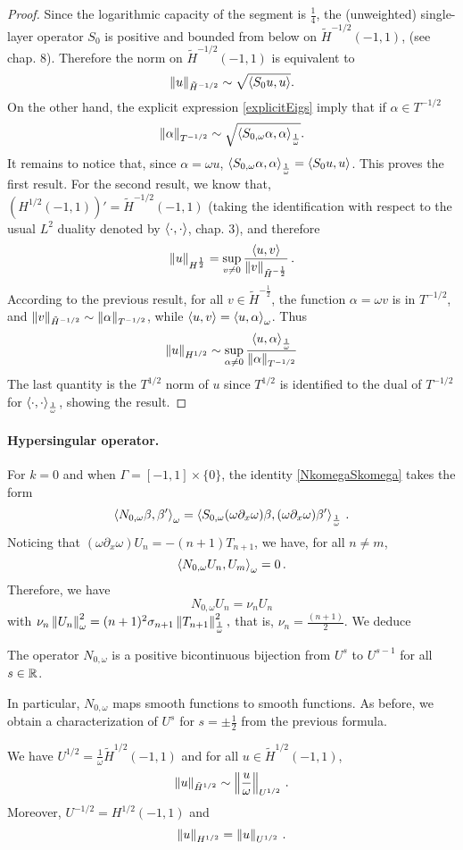 \documentclass[a4paper]{article}
\begin{document}
\begin{proof}
	Since the logarithmic capacity of the segment is $\frac{1}{4}$, the (unweighted) single-layer operator $S_0$ is positive and bounded from below on $\tilde{H}^{-1/2}(-1,1)$, (see \cite{mclean2000strongly} chap. 8). Therefore the norm on $\tilde{H}^{-1/2}(-1,1)$ is equivalent to 
	\[\left\|u\right\|_{\tilde{H}^{-1/2}} \sim \sqrt{\left\langle S_0u,u\right\rangle}.\]
	On the other hand, the explicit expression \eqref{explicitEigs} imply that if $\alpha\in T^{-1/2}$
	\[ \left\|\alpha\right\|_{T^{-1/2}} \sim \sqrt{\left\langle S_{0,\omega} \alpha,\alpha\right\rangle_\frac{1}{\omega}}.\]
	It remains to notice that, since $\alpha=\omega u$, $\left\langle S_{0,\omega} \alpha,\alpha\right\rangle_\frac{1}{\omega} = \left\langle S_0u,u\right\rangle$. This proves the first result. For the second result, we know that, $(H^{1/2}(-1,1))' =  \tilde{H}^{-1/2}(-1,1)$ (taking the identification with respect to the usual $L^2$ duality denoted by $\left\langle \cdot,\cdot\right\rangle$, \cite{mclean1986spectral} chap. 3), and therefore
	\[\left\|u\right\|_{H^{\frac{1}{2}}} = \sup_{ v\neq 0} \dfrac{\left\langle u,v\right\rangle}{\left\|v\right\|_{\tilde{H}^{-\frac{1}{2}}}}\,.\]
	According to the previous result, for all $v\in \tilde{H}^{-\frac{1}{2}}$, the function $\alpha = \omega v$ is in $T^{-1/2}$, and $\left\| v\right\|_{\tilde{H}^{-1/2}} \sim \left\|\alpha\right\|_{T^{-1/2}}$, while $\left\langle u,v\right\rangle = \left\langle u,\alpha\right\rangle_\omega$. Thus 
	\[\left\|u\right\|_{H^{1/2}} \sim \sup_{\alpha \neq 0} \dfrac{\left\langle u,\alpha\right\rangle_\frac{1}{\omega}}{\left\|\alpha\right\|_{T^{-1/2}}}\]
	The last quantity is the $T^{1/2}$ norm of $u$ since $T^{1/2}$ is identified to the dual of $T^{-1/2}$ for $\left\langle \cdot,\cdot\right\rangle_\frac{1}{\omega}$, showing the result. 
\end{proof}


\paragraph{Hypersingular operator.}For $k = 0$ and when $\Gamma = [-1,1]\times \{0\}$, the identity \eqref{NkomegaSkomega} takes the form
\[\left\langle N_{0,\omega} \beta,\beta'\right\rangle_\omega = \left\langle S_{0,\omega}  (\omega \partial_x \omega) \beta, (\omega \partial_x \omega) \beta'\right\rangle_\frac{1}{\omega}\,.\] 
Noticing that $(\omega \partial_x \omega) U_n = -(n+1) T_{n+1}$, we have, for all $n \neq m$,
\[\left\langle N_{0,\omega }U_n,U_m\right\rangle_\omega = 0 \,.\]
Therefore, we have 
\[N_{0,\omega} U_n = \nu_n U_n\] 
with 
$\nu_n\left\|U_n\right\|_{\omega}^2 = (n+1)^2 \sigma_{n+1} \left\|T_{n+1}\right\|_\frac{1}{\omega}^2,$
that is, $\nu_n = \frac{(n+1)}{2}$.
We deduce 
\begin{Lem}
	The operator $N_{0,\omega}$ is a positive bicontinuous bijection from $U^s$ to $U^{s-1}$ for all $s \in \mathbb{R}$.
	\label{NomegaMapProp}
\end{Lem} 
\noindent In particular, $N_{0,\omega}$ maps smooth functions to smooth functions. 
As before, we obtain a characterization of $U^{s}$ for $s = \pm \frac{1}{2}$ from the previous formula.
\begin{Lem} 
	\label{LemU12}	
	We have $U^{1/2} =  \frac{1}{\omega} \tilde{H}^{1/2}(-1,1)$ and for all $u\in \tilde{H}^{1/2}(-1,1)$,
	\[\left\|u\right\|_{\tilde{H}^{1/2}} \sim \left\|\frac{u}{\omega}\right\|_{U^{1/2}}\,.\]
	Moreover, $U^{-1/2} = H^{1/2}(-1,1)$ and 
	\[\left\|u\right\|_{H^{1/2}} = \left\|u\right\|_{U^{1/2}}\,.\]
\end{Lem}
\end{document}
